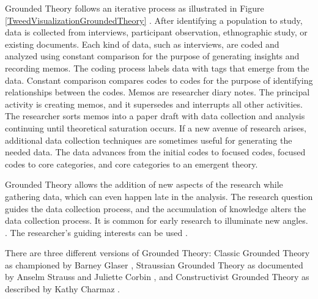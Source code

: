 Grounded Theory follows an iterative process as illustrated in Figure \ref{TweedVisualizationGroundedTheory} \cite{TweedGroundedTheory}. After identifying a population to study, data is collected from interviews, participant observation, ethnographic study, or existing documents. Each kind of data, such as interviews, are coded and analyzed using constant comparison for the purpose of generating insights and recording memos. The coding process labels data with tags that emerge from the data. Constant comparison compares codes to codes for the purpose of identifying relationships between the codes. Memos are researcher diary notes. The principal activity is creating memos, and it supersedes and interrupts all other activities. The researcher sorts memos into a paper draft with data collection and analysis continuing until theoretical saturation occurs. If a new avenue of research arises,  additional data collection techniques are sometimes useful for generating the needed data. The data advances from the initial codes to focused codes, focused codes to core categories, and core categories to an emergent theory. 


Grounded Theory allows the addition of new aspects of the research while gathering data, which can even happen late in the analysis. The research question guides the data collection process, and the accumulation of knowledge alters the data collection process. It is common for early research to illuminate new angles.  \cite{Charmaz}. The researcher's guiding interests can be used  \cite{Charmaz}.

There are three different versions of Grounded Theory: Classic Grounded Theory as championed by Barney Glaser \cite{GlaserDiscovery}, Straussian Grounded Theory as documented by Anselm Strauss and Juliette Corbin \cite{Strauss1988Basics}, and Constructivist Grounded Theory as described by Kathy Charmaz \cite{Charmaz}. 

